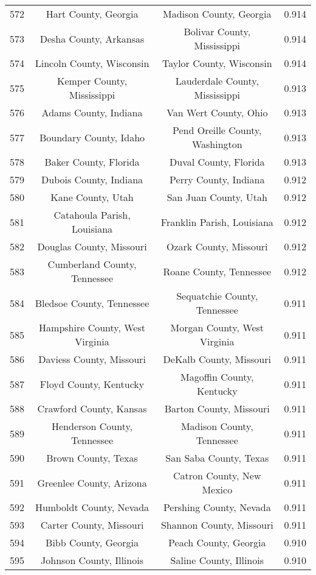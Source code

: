 \begin{longtable}{cccc}
  572 & Hart County, Georgia & Madison County, Georgia & 0.914 \\ 
  573 & Desha County, Arkansas & Bolivar County, Mississippi & 0.914 \\ 
  574 & Lincoln County, Wisconsin & Taylor County, Wisconsin & 0.914 \\ 
  575 & Kemper County, Mississippi & Lauderdale County, Mississippi & 0.913 \\ 
  576 & Adams County, Indiana & Van Wert County, Ohio & 0.913 \\ 
  577 & Boundary County, Idaho & Pend Oreille County, Washington & 0.913 \\ 
  578 & Baker County, Florida & Duval County, Florida & 0.913 \\ 
  579 & Dubois County, Indiana & Perry County, Indiana & 0.912 \\ 
  580 & Kane County, Utah & San Juan County, Utah & 0.912 \\ 
  581 & Catahoula Parish, Louisiana & Franklin Parish, Louisiana & 0.912 \\ 
  582 & Douglas County, Missouri & Ozark County, Missouri & 0.912 \\ 
  583 & Cumberland County, Tennessee & Roane County, Tennessee & 0.912 \\ 
  584 & Bledsoe County, Tennessee & Sequatchie County, Tennessee & 0.911 \\ 
  585 & Hampshire County, West Virginia & Morgan County, West Virginia & 0.911 \\ 
  586 & Daviess County, Missouri & DeKalb County, Missouri & 0.911 \\ 
  587 & Floyd County, Kentucky & Magoffin County, Kentucky & 0.911 \\ 
  588 & Crawford County, Kansas & Barton County, Missouri & 0.911 \\ 
  589 & Henderson County, Tennessee & Madison County, Tennessee & 0.911 \\ 
  590 & Brown County, Texas & San Saba County, Texas & 0.911 \\ 
  591 & Greenlee County, Arizona & Catron County, New Mexico & 0.911 \\ 
  592 & Humboldt County, Nevada & Pershing County, Nevada & 0.911 \\ 
  593 & Carter County, Missouri & Shannon County, Missouri & 0.911 \\ 
  594 & Bibb County, Georgia & Peach County, Georgia & 0.910 \\ 
  595 & Johnson County, Illinois & Saline County, Illinois & 0.910 \\ 

\end{longtable}
